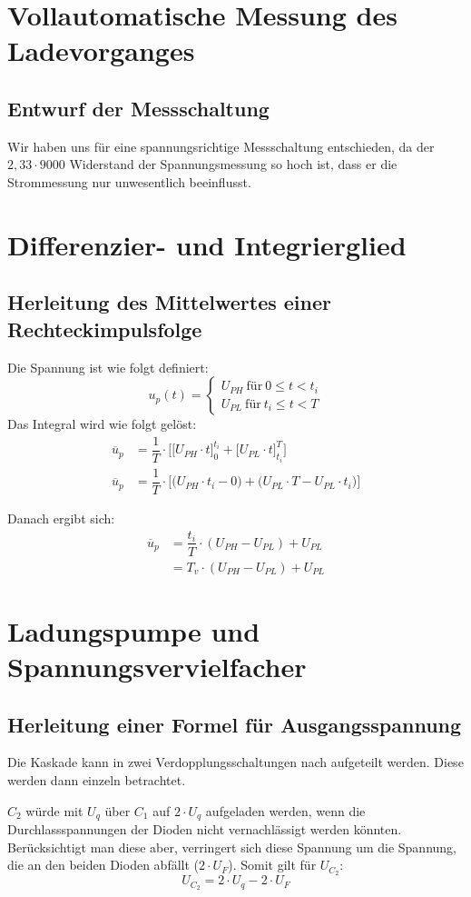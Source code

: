 \documentclass[
12pt,
a4paper,
bibliography=totoc,
listof=totoc,
headings=small,
parskip=half*, %
]{scrartcl}
\newcommand{\laborsubsection}[2] {
	\renewcommand{\thesubsection}{#1 \thesection.\arabic{subsection}}
	\subsection{#2}
	\renewcommand{\thesubsection}{\thesection.\arabic{subsection}}
}
\begin{document}
\section{Vollautomatische Messung des Ladevorganges}
\laborsubsection{V}{Entwurf der Messschaltung}
Wir haben uns für eine spannungsrichtige Messschaltung entschieden, da der $ 2,33 \cdot 9000 $ Widerstand der Spannungsmessung so hoch ist, dass er die Strommessung nur unwesentlich beeinflusst.


\section{Differenzier- und Integrierglied}
\laborsubsection{V}{Herleitung des Mittelwertes einer Rechteckimpulsfolge}
Die Spannung ist wie folgt definiert:
\begin{equation}
	u_p (t) =
	\begin{cases}
		U_{PH} ~ \text{für} ~ 0 \le t < t_{i} \\
		U_{PL} ~ \text{für} ~ t_{i} \le t < T
	\end{cases}
\end{equation}
Das Integral wird wie folgt gelöst:
\begin{align}
	\overline{u}_p & = \dfrac{1}{T} \cdot \Bigg [ \big [ U_{PH} \cdot t \big     ]_0^{t_{i}}   +    \big [  U_{PL} \cdot t \big ]_{t_{i}}^T    \Bigg ] \\
	\overline{u}_p & = \dfrac{1}{T} \cdot  \Bigg [ \Big ( U_{PH} \cdot t_{i} - 0 \Big ) + \Big ( U_{PL} \cdot T - U_{PL} \cdot t_{i} \Big ) \Bigg ]
\end{align}

Danach ergibt sich:
\begin{align}
	\overline{u}_p & = \dfrac{t_{i}}{T} \cdot (U_{PH}-U_{PL}) + U_{PL} \\
	               & = T_{v} \cdot (U_{PH}-U_{PL}) + U_{PL}
\end{align}


\section{Ladungspumpe und Spannungsvervielfacher}
\laborsubsection{V}{Herleitung einer Formel für Ausgangsspannung}
Die Kaskade kann in zwei Verdopplungsschaltungen nach \autocite[42]{moeller} aufgeteilt werden. Diese werden dann einzeln betrachtet.

$C_2$ würde mit $U_q$ über $C_1$ auf $2\cdot U_{q}$ aufgeladen werden, wenn die Durchlassspannungen der Dioden nicht vernachlässigt werden könnten. Berücksichtigt man diese aber, verringert sich diese Spannung um die Spannung, die an den beiden Dioden abfällt ($ 2 \cdot U_{F} $). Somit gilt für $U_{C_2}$:
\begin{equation}
	U_{C_2} = 2 \cdot U_{q} - 2 \cdot U_{F}
\end{equation}
\end{document}
